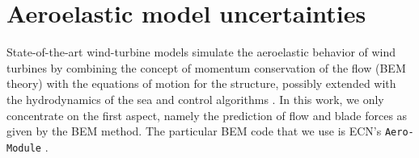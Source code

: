 %
%
%
%

\section{Aeroelastic model uncertainties}\label{sec:model_description}
State-of-the-art wind-turbine models simulate the aeroelastic behavior of wind turbines by combining the concept of momentum conservation of the flow (BEM theory) with the equations of motion for the structure, possibly extended with the hydrodynamics of the sea and control algorithms \cite{Vorpahl2013}. In this work, we only concentrate on the first aspect, namely the prediction of flow and blade forces as given by the BEM method. The particular BEM code that we use is ECN's \texttt{Aero-Module} \cite{Boorsma2012}.

